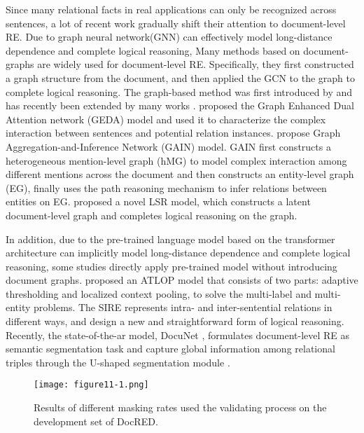 \documentclass{article}
\begin{document}
\begin{table*}[th]
Since many relational facts in real applications can only be recognized across sentences, a lot of recent work gradually shift their attention to document-level RE.
Due to graph neural network(GNN) can effectively model long-distance dependence and complete logical reasoning, Many methods based on document-graphs are widely used for document-level RE.
Specifically, they first constructed a graph structure from the document, and then applied the GCN \cite{c:18,c:51} to the graph to complete logical reasoning.
The graph-based method was first introduced by \cite{c:52} and has recently been extended by many works \cite{c:15,c:36,c:40,c:53,c:16,c:14,c:10,c:27}.
\cite{c:36} proposed the Graph Enhanced Dual Attention network (GEDA) model and used it to characterize the complex interaction between sentences and potential relation instances.
\cite{c:10} propose Graph Aggregation-and-Inference Network (GAIN) model.
GAIN first constructs a heterogeneous mention-level graph (hMG) to model complex interaction among different mentions across the document and then constructs an entity-level graph (EG), finally uses the path reasoning mechanism to infer relations between entities on EG.
\cite{c:14} proposed a novel LSR model, which constructs a latent document-level graph and completes logical reasoning on the graph.

In addition, due to the pre-trained language model based on the transformer architecture can implicitly model long-distance dependence and complete logical reasoning, some studies \cite{c:19,c:11,c:38} directly apply pre-trained model without introducing document graphs.
\cite{c:11} proposed an ATLOP model that consists of two parts: adaptive thresholding and localized context pooling, to solve the multi-label and multi-entity problems.
The SIRE \cite{c:42} represents intra- and inter-sentential relations in different ways, and design a new and straightforward form of logical reasoning.
Recently, the state-of-the-ar model, DocuNet \cite{c:13},  formulates document-level RE as semantic segmentation task and capture  global information among relational triples through the U-shaped segmentation module \cite{c:41}.

\begin{figure}[t]
\centering
\texttt{[image: figure11-1.png]} \caption{Results of different masking rates used the validating process on the development set of DocRED.}
\label{fig5}
\end{figure}



\end{table*}
\end{document}
